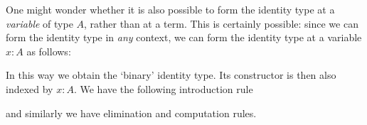 \begin{rmk}
  One might wonder whether it is also possible to form the identity type at a \emph{variable} of type $A$, rather than at a term. This is certainly possible: since we can form the identity type in \emph{any} context, we can form the identity type at a variable $x:A$ as follows:
  \begin{prooftree}
  \end{prooftree}
  In this way we obtain the `binary' identity type. Its constructor is then also indexed by $x:A$. We have the following introduction rule
  \begin{prooftree}
  \end{prooftree}
  and similarly we have elimination and computation rules.
\end{rmk}
 

\begin{comment}
In the following lemma we show that the identity type on $A$ is contained in any reflexive relation on $A$.

\begin{lem}
Let $\Gamma,x:A,y:A\vdash R(x,y)~\mathrm{type}$\index{reflexive relation}\index{relation!reflexive}, and suppose that $R$ is reflexive in the sense that there is a term
\begin{equation*}
\rho:\prd{x:A}R(x,x)
\end{equation*}
Then there is a term of type
\begin{equation*}
\prd{y:A} (x=_A y)\to R(x,y)
\end{equation*}
in context $\Gamma,x:A$.
\end{lem}

\begin{constr}
By weakening the reflexive relation $R$ we obtain
\begin{equation*}
\Gamma,x:A,y:A,\alpha:x=_A y\vdash R(x,y)~\mathrm{type},
\end{equation*}
on which the induction principle is applicable.
Thus we see that by the induction principle for identity types we have a term
\begin{equation*}
\mathsf{path\usc{}ind}_x : R(x,x)\to \prd{y:A}(x=_A y)\to R(x,y)
\end{equation*}
so it suffices to construct a term of type $R(x,x)$, which we have by reflexivity of $R$.
\end{constr}
\end{comment}

